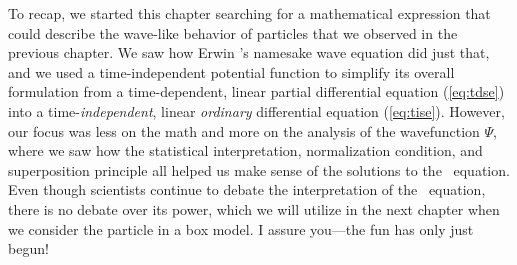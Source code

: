 To recap, we started this chapter searching for a mathematical expression that could describe the wave-like behavior of particles that we observed in the previous chapter. 
We saw how Erwin \Sch's namesake wave equation did just that, and we used a time-independent potential function to simplify its overall formulation from a time-dependent, linear partial differential equation (\autoref{eq:tdse}) into a time-\emph{independent}, linear \emph{ordinary} differential equation (\autoref{eq:tise}). 
However, our focus was less on the math and more on the analysis of the wavefunction $\Psi$, where we saw how the statistical interpretation, normalization condition, and superposition principle all helped us make sense of the solutions to the \Sch\ equation. 
Even though scientists continue to debate the interpretation of the \Sch\ equation, there is no debate over its power, which we will utilize in the next chapter when we consider the particle in a box model. 
I assure you---the fun has only just begun!

%